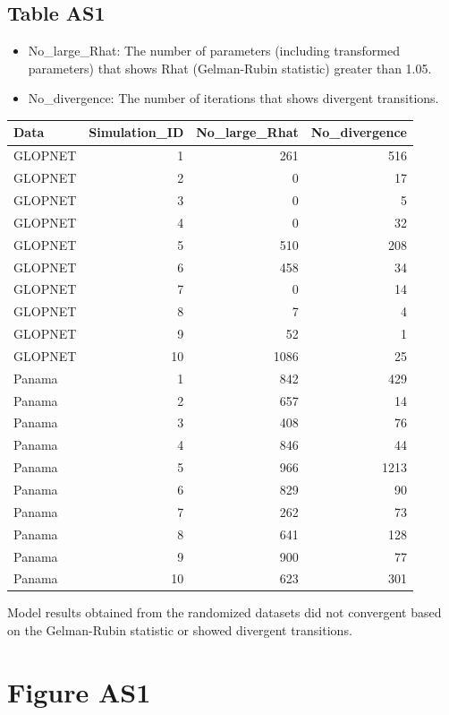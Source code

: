 \documentclass[
  12pt,
  letterpaper,
  DIV=11,
  numbers=noendperiod]{scrartcl}
\providecommand{\tightlist}{%
  \setlength{\itemsep}{0pt}\setlength{\parskip}{0pt}}\usepackage{longtable,booktabs,array}
\begin{document}
\hypertarget{table-as1}{%
\subsection{Table AS1}\label{table-as1}}

\begin{itemize}
\tightlist
\item
  No\_large\_Rhat: The number of parameters (including transformed
  parameters) that shows Rhat (Gelman-Rubin statistic) greater than
  1.05.
\item
  No\_divergence: The number of iterations that shows divergent
  transitions.
\end{itemize}

\begin{longtable}[]{@{}lrrr@{}}
\toprule()
Data & Simulation\_ID & No\_large\_Rhat & No\_divergence \\
\midrule()
\endhead
GLOPNET & 1 & 261 & 516 \\
GLOPNET & 2 & 0 & 17 \\
GLOPNET & 3 & 0 & 5 \\
GLOPNET & 4 & 0 & 32 \\
GLOPNET & 5 & 510 & 208 \\
GLOPNET & 6 & 458 & 34 \\
GLOPNET & 7 & 0 & 14 \\
GLOPNET & 8 & 7 & 4 \\
GLOPNET & 9 & 52 & 1 \\
GLOPNET & 10 & 1086 & 25 \\
Panama & 1 & 842 & 429 \\
Panama & 2 & 657 & 14 \\
Panama & 3 & 408 & 76 \\
Panama & 4 & 846 & 44 \\
Panama & 5 & 966 & 1213 \\
Panama & 6 & 829 & 90 \\
Panama & 7 & 262 & 73 \\
Panama & 8 & 641 & 128 \\
Panama & 9 & 900 & 77 \\
Panama & 10 & 623 & 301 \\
\bottomrule()
\end{longtable}

Model results obtained from the randomized datasets did not convergent
based on the Gelman-Rubin statistic or showed divergent transitions.

\newpage

\hypertarget{figure-as1}{%
\section{Figure AS1}\label{figure-as1}}
\end{document}
